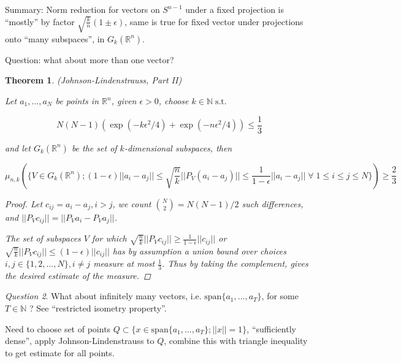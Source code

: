 \documentclass[12pt]{article}
\newtheorem{thm}{Theorem}[section]
\theoremstyle{remark}
\newtheorem{question}[thm]{Question}
\def\eps{\epsilon}
\newcommand{\nats}[0] { \mathbb{N}}
\newcommand{\reals}[0] { \mathbb{R}}
\newcommand{\st}[0]{ \; \textrm{s.t.} \; }
\begin{document}
Summary: Norm reduction for vectors on $S^{n-1}$ under a fixed projection is ``mostly'' by factor $\sqrt{\frac{k}{n}}(1 \pm \eps )$, same is true for fixed vector under projections onto ``many subspaces'', in $G_k(\reals^n)$.

Question: what about more than one vector?

\begin{thm}

(Johnson-Lindenstrauss, Part II)

Let $a_1, ..., a_N$ be points in $\reals^n$, given $\eps>0$, choose $k \in \nats \st$

$$
	N(N-1) ( \exp(-k \eps^2/4) + \exp(-n \eps^2/4) ) \le \frac{1}{3}
$$

and let $G_k( \reals^n )$ be the set of $k$-dimensional subspaces, then

$$
	\mu_{n,k} (\{ V \in G_k( \reals^n ) ; (1-\eps) || a_i - a_j|| \le \sqrt{\frac{n}{k}} || P_V(a_i - a_j)|| \le \frac{1}{1-\eps} || a_i - a_j||  \; \forall \; 1 \le i \le j \le N \}) \ge \frac{2}{3}
$$

\begin{proof}

Let $c_{ij} = a_i-a_j, i>j$, we count ${N \choose 2} = N(N-1)/2$ such differences, and $ ||P_V c_{ij}|| = ||P_V a_i - P_V a_j ||$. 

The set of subspaces $V$ for which $\sqrt{\frac{n}{k}} || P_V c_{ij} || \ge \frac{1}{1-\eps} ||c_{ij}||$ or $\sqrt{\frac{n}{k}} || P_V c_{ij} || \le (1-\eps) ||c_{ij}||$ has by assumption a union bound over choices $i,j \in \{ 1,2,...,N\}, i \not = j$ measure at most $\frac{1}{3}$. Thus by taking the complement, gives the desired estimate of the measure.

\end{proof}

\end{thm}

\begin{question}

What about infinitely many vectors, i.e. $ \textrm{span} \{ a_1, ..., a_T \}$, for some $T \in \nats$ ? See ``restricted isometry property''.

Need to choose set of points $Q \subset \{ x \in \textrm{span} \{ a_1, ..., a_T \};  ||x|| =1 \}$, ``sufficiently dense'', apply Johnson-Lindenstrauss to $Q$, combine this with triangle inequality to get estimate for all points. 

\end{question}
\end{document}
